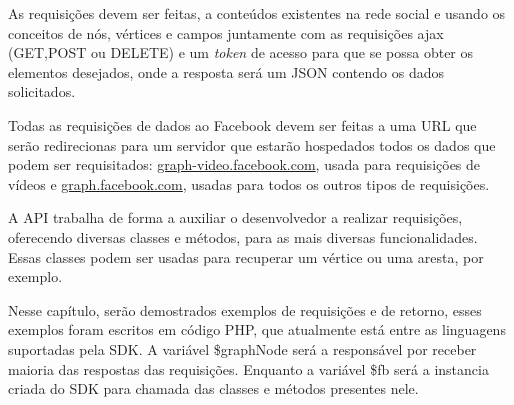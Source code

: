 As requisições devem ser feitas, a conteúdos existentes na rede social e usando os conceitos de nós, vértices e campos juntamente com as requisições ajax (GET,POST ou DELETE) e um \textit{token} de acesso para que se possa obter os elementos desejados, onde a resposta será um JSON contendo os dados solicitados.

Todas as requisições de dados ao Facebook devem ser feitas a uma URL que serão redirecionas para um servidor que estarão hospedados todos os dados que podem ser requisitados: \url{graph-video.facebook.com}, usada para requisições de vídeos e \url{graph.facebook.com}, usadas para todos os outros tipos de requisições.

A API trabalha de forma a auxiliar o desenvolvedor a realizar requisições, oferecendo diversas classes e métodos, para as mais diversas funcionalidades. Essas classes podem ser usadas para recuperar um vértice ou uma aresta, por exemplo.

Nesse capítulo, serão demostrados exemplos de requisições e de retorno, esses exemplos foram escritos em código PHP, que atualmente está entre as linguagens suportadas pela SDK. A variável \$graphNode será a responsável por receber maioria das respostas das requisições. Enquanto a variável \$fb será a instancia criada do SDK para chamada das classes e métodos presentes nele. 


